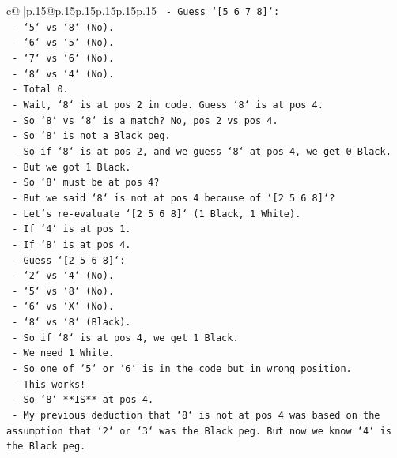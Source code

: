 \documentclass{article}
\begin{document}
{\begin{supertabular}{c@{$\;$}|p{.15\linewidth}@{}p{.15\linewidth}p{.15\linewidth}p{.15\linewidth}p{.15\linewidth}p{.15\linewidth}}
{{{\texttt{        {-} Guess `{[}5 6 7 8{]}`:} \\
\texttt{            {-} `5` vs `8` (No).} \\
\texttt{            {-} `6` vs `5` (No).} \\
\texttt{            {-} `7` vs `6` (No).} \\
\texttt{            {-} `8` vs `4` (No).} \\
\texttt{            {-} Total 0.} \\
\texttt{        {-} Wait, `8` is at pos 2 in code. Guess `8` is at pos 4.} \\
\texttt{        {-} So `8` vs `8` is a match? No, pos 2 vs pos 4.} \\
\texttt{        {-} So `8` is not a Black peg.} \\
\texttt{        {-} So if `8` is at pos 2, and we guess `8` at pos 4, we get 0 Black.} \\
\texttt{        {-} But we got 1 Black.} \\
\texttt{        {-} So `8` must be at pos 4?} \\
\texttt{        {-} But we said `8` is not at pos 4 because of `{[}2 5 6 8{]}`?} \\
\texttt{        {-} Let's re{-}evaluate `{[}2 5 6 8{]}` (1 Black, 1 White).} \\
\texttt{        {-} If `4` is at pos 1.} \\
\texttt{        {-} If `8` is at pos 4.} \\
\texttt{        {-} Guess `{[}2 5 6 8{]}`:} \\
\texttt{            {-} `2` vs `4` (No).} \\
\texttt{            {-} `5` vs `8` (No).} \\
\texttt{            {-} `6` vs `X` (No).} \\
\texttt{            {-} `8` vs `8` (Black).} \\
\texttt{            {-} So if `8` is at pos 4, we get 1 Black.} \\
\texttt{            {-} We need 1 White.} \\
\texttt{            {-} So one of `5` or `6` is in the code but in wrong position.} \\
\texttt{            {-} This works!} \\
\texttt{        {-} So `8` **IS** at pos 4.} \\
\texttt{        {-} My previous deduction that `8` is not at pos 4 was based on the assumption that `2` or `3` was the Black peg. But now we know `4` is the Black peg.} \\
}}}
\end{supertabular}}
\end{document}
